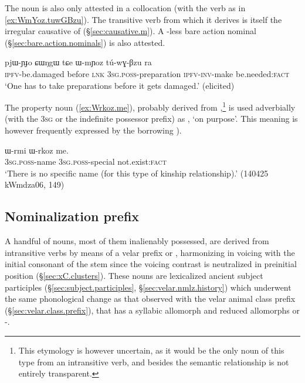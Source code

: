 The noun  is also only attested in a collocation  (with the verb  as in \ref{ex:WmYoz.tuwGBzu}). The transitive verb  from which it derives is itself the irregular causative of  (§\ref{sec:causative.m}). A -less bare action nominal  (§\ref{sec:bare.action.nominals}) is also attested.

\begin{exe}
\ex \label{ex:WmYoz.tuwGBzu}
\gll  pjɯ-ɲɟo ɕɯŋgɯ tɕe ɯ-mɲoz tú-wɣ-βzu ra \\
\textsc{ipfv}-be.damaged before \textsc{lnk} \textsc{3sg}.\textsc{poss}-preparation \textsc{ipfv}-\textsc{inv}-make be.needed:\textsc{fact} \\
\glt `One has to take preparations before it gets damaged.' (elicited)
\end{exe}
 
The property noun  (\ref{ex:Wrkoz.me}), probably derived from ,\footnote{This etymology is however uncertain, as it would be the only noun of this type from an intransitive verb, and besides the semantic relationship is not entirely transparent.  }  is used adverbially (with the \textsc{3sg} or the indefinite possessor prefix) as  , `on purpose'. This meaning is however frequently expressed by the borrowing ).

\begin{exe}
\ex \label{ex:Wrkoz.me}
\gll ɯ-rmi ɯ-rkoz me. \\
\textsc{3sg}.\textsc{poss}-name \textsc{3sg}.\textsc{poss}-special not.exist:\textsc{fact} \\
\glt `There is no specific name (for this type of kinship relationship).' (140425 kWmdza06, 149)
\end{exe}




\subsection{Nominalization  prefix} \label{sec:G.nmlz}
A handful of nouns, most of them inalienably possessed, are derived from intransitive verbs by means of a velar prefix   or , harmonizing in voicing with the initial consonant of the stem since the voicing contrast is neutralized in preinitial position (§\ref{sec:xC.clusters}). These nouns are lexicalized ancient subject participles (§\ref{sec:subject.participles}, §\ref{sec:velar.nmlz.history}) which underwent the same phonological change as that observed with the velar animal class prefix (§\ref{sec:velar.class.prefix}), that has a syllabic allomorph  and reduced allomorphs  or -. 

